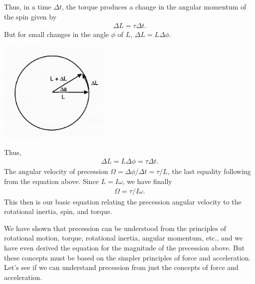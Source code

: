 Thus, in a time \(\Delta t\), the torque produces a change in the angular momentum of the spin given by
\begin{align} \Delta L = \tau\Delta t. \label{6Aexp7_eqn_6} \end{align}
But for small changes in the angle \(\phi\) of \(L\), \(\Delta L = L\Delta\phi\).
\begin{center} \includegraphics*[width=0.4\textwidth]{imgs/6labs/6Alab/6Aexp7/circle_equation_sm.png} \end{center}
Thus,
\begin{align} \Delta L = L\Delta\phi = \tau\Delta t. \label{6Aexp7_eqn_7} \end{align}
The angular velocity of precession \(\Omega = \Delta\phi/\Delta t = \tau/L\), the last equality following from the equation above.  Since \(L =  I\omega\), we have finally
\begin{align} \Omega = \tau/I\omega. \label{6Aexp7_eqn_8} \end{align}
This then is our basic equation relating the precession angular velocity to the rotational inertia, spin, and torque.

We have shown that precession can be understood from the principles of rotational motion, torque, rotational inertia, angular momentum, etc., and we have even derived the equation for the magnitude of the precession above.  But these concepts must be based on the simpler principles of force and acceleration.  Let's see if we can understand precession from just the concepts of force and acceleration.

